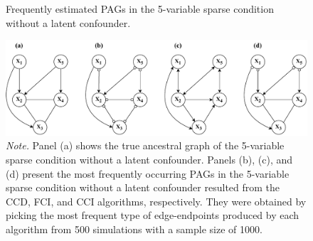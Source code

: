 \documentclass[twoside, 11pt]{article}
\begin{document}
\begin{figure}[!t]
    \centering
        \caption{Frequently estimated PAGs in the 5-variable sparse condition without a latent confounder.}
        \vspace{1mm}
        \includegraphics[width=1\textwidth]{figures/Fig16.pdf}
        \vspace{1mm}
        \caption*{\small{\textit{Note.} Panel (a) shows the true ancestral graph of the 5-variable sparse condition without a latent confounder. Panels (b), (c), and (d) present the most frequently occurring PAGs in the 5-variable sparse condition without a latent confounder resulted from the CCD, FCI, and CCI algorithms, respectively. They were obtained by picking the most frequent type of edge-endpoints produced by each algorithm from 500 simulations with a sample size of 1000.}}

    \label{fig:18}
\end{figure}
\end{document}
